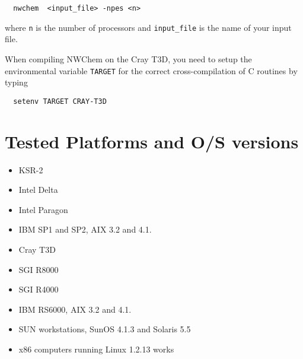 \begin{verbatim}
  nwchem  <input_file> -npes <n>
\end{verbatim}

where \verb+n+ is the number of processors and \verb+input_file+ is the
name of your input file.

When compiling NWChem on the Cray T3D, you need to setup the
environmental variable {\tt TARGET} for the correct cross-compilation
of C routines by typing
\begin{verbatim}
  setenv TARGET CRAY-T3D
\end{verbatim}

\section{Tested Platforms and O/S versions}

\begin{itemize}
\item KSR-2 
\item Intel Delta 
\item Intel Paragon 
\item IBM SP1 and SP2, AIX 3.2 and 4.1.
\item Cray T3D
\item SGI R8000
\item SGI R4000
\item IBM RS6000, AIX 3.2 and 4.1.
\item SUN workstations, SunOS 4.1.3 and Solaris 5.5
\item x86 computers running Linux 1.2.13 works
\end{itemize}
